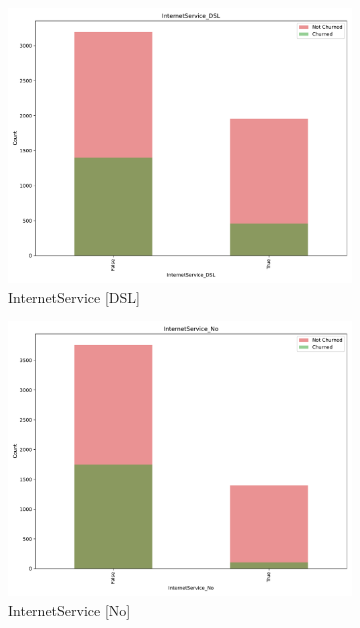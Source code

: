\documentclass[a4paper,11pt]{article}
\begin{document}
\begin{landscape}
\begin{figure}
\begin{subfigure}{0.13\linewidth}
    \includegraphics[width=\linewidth]{figures/understanding/InternetService_DSL.pdf}
    \caption{InternetService [DSL]}
\end{subfigure}
\begin{subfigure}{0.14\linewidth}
    \includegraphics[width=\linewidth]{figures/understanding/InternetService_No.pdf}
    \caption{InternetService [No]}
\end{subfigure}
\begin{subfigure}{0.14\linewidth}

\end{subfigure}
\end{figure}
\end{landscape}
\end{document}
